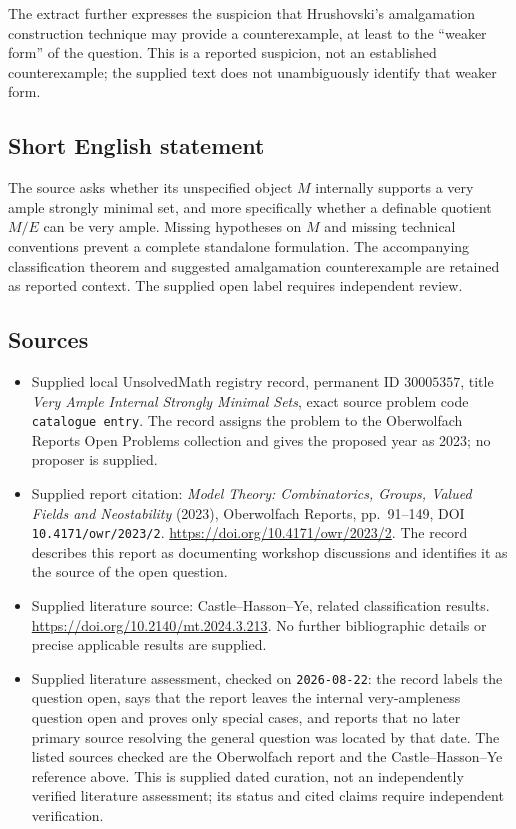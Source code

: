 \documentclass[11pt]{article}
\begin{document}
The extract further expresses the suspicion that Hrushovski's amalgamation construction technique may provide a counterexample, at least to the ``weaker form'' of the question. This is a reported suspicion, not an established counterexample; the supplied text does not unambiguously identify that weaker form.
\subsection{Short English statement}
The source asks whether its unspecified object \(M\) internally supports a very ample strongly minimal set, and more specifically whether a definable quotient \(M/E\) can be very ample. Missing hypotheses on \(M\) and missing technical conventions prevent a complete standalone formulation. The accompanying classification theorem and suggested amalgamation counterexample are retained as reported context. The supplied open label requires independent review.
\subsection{Sources}
\begin{itemize}
\item Supplied local UnsolvedMath registry record, permanent ID \(30005357\), title \emph{Very Ample Internal Strongly Minimal Sets}, exact source problem code \texttt{catalogue entry}. The record assigns the problem to the Oberwolfach Reports Open Problems collection and gives the proposed year as 2023; no proposer is supplied.
\item Supplied report citation: \emph{Model Theory: Combinatorics, Groups, Valued Fields and Neostability} (2023), Oberwolfach Reports, pp.\ 91--149, DOI \texttt{10.4171/owr/2023/2}. \url{https://doi.org/10.4171/owr/2023/2}. The record describes this report as documenting workshop discussions and identifies it as the source of the open question.
\item Supplied literature source: Castle--Hasson--Ye, related classification results. \url{https://doi.org/10.2140/mt.2024.3.213}. No further bibliographic details or precise applicable results are supplied.
\item Supplied literature assessment, checked on \texttt{2026-08-22}: the record labels the question open, says that the report leaves the internal very-ampleness question open and proves only special cases, and reports that no later primary source resolving the general question was located by that date. The listed sources checked are the Oberwolfach report and the Castle--Hasson--Ye reference above. This is supplied dated curation, not an independently verified literature assessment; its status and cited claims require independent verification.
\end{itemize}
\end{document}

